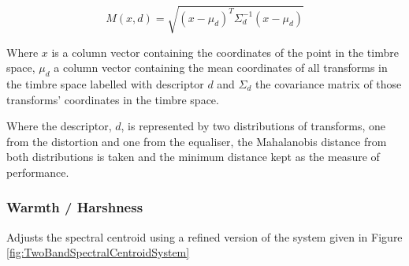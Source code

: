 		\begin{equation}
			M(x, d) = \sqrt{(x - \mu_{d})^{T}\Sigma_{d}^{-1}(x - \mu_{d})}
			\label{eq:Mahalanobis}
		\end{equation}

		Where $x$ is a column vector containing the coordinates of the point in the timbre space, $\mu_{d}$ a column
		vector containing the mean coordinates of all transforms in the timbre space labelled with descriptor $d$
		and $\Sigma_{d}$ the covariance matrix of those transforms' coordinates in the timbre space.

		Where the descriptor, $d$, is represented by two distributions of transforms, one from the distortion and
		one from the equaliser, the Mahalanobis distance from both distributions is taken and the minimum distance
		kept as the measure of performance.

		\subsubsection*{Warmth / Harshness}
			\note
			{
				Adjusts the spectral centroid using a refined version of the system given in Figure
				\ref{fig:TwoBandSpectralCentroidSystem}
			}

